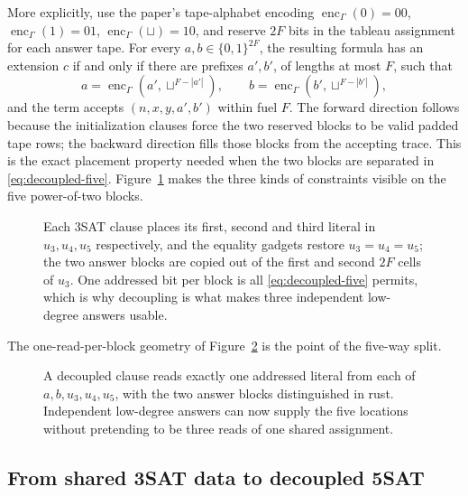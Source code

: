 More explicitly, use the paper's tape-alphabet encoding
\(\operatorname{enc}_\Gamma(0)=00\),
\(\operatorname{enc}_\Gamma(1)=01\),
\(\operatorname{enc}_\Gamma(\sqcup)=10\), and reserve \(2F\) bits in the
tableau assignment for each answer tape.  For every
\(a,b\in\{0,1\}^{2F}\), the resulting formula has an extension \(c\) if and
only if there are prefixes \(a',b'\), of lengths at most \(F\), such that
\[
 a=\operatorname{enc}_\Gamma(a',\sqcup^{F-|a'|}),\qquad
 b=\operatorname{enc}_\Gamma(b',\sqcup^{F-|b'|}),
\]
and the term accepts \((n,x,y,a',b')\) within fuel \(F\).  The forward
direction follows because the initialization clauses force the two reserved
blocks to be valid padded tape rows; the backward direction fills those blocks
from the accepting trace.  This is the exact placement property needed when
the two blocks are separated in \eqref{eq:decoupled-five}.
Figure~\ref{fig:decoupled-5sat} makes the three kinds of constraints visible
on the five power-of-two blocks.
\begin{figure}[t]
\centering

\caption{Each 3SAT clause places its first, second and third literal in \(u_3,u_4,u_5\) respectively, and the equality gadgets restore \(u_3=u_4=u_5\); the two answer blocks are copied out of the first and second \(2F\) cells of \(u_3\).  One addressed bit per block is all \eqref{eq:decoupled-five} permits, which is why decoupling is what makes three independent low-degree answers usable.}
\label{fig:decoupled-5sat}
\end{figure}

The one-read-per-block geometry of Figure~\ref{fig:D-five-block-read} is the
point of the five-way split.
\begin{figure}[H]
\centering

\caption{A decoupled clause reads exactly one addressed literal from each of \(a,b,u_3,u_4,u_5\), with the two answer blocks distinguished in rust.  Independent low-degree answers can now supply the five locations without pretending to be three reads of one shared assignment.}
\label{fig:D-five-block-read}
\end{figure}

\subsection{From shared 3SAT data to decoupled 5SAT}

